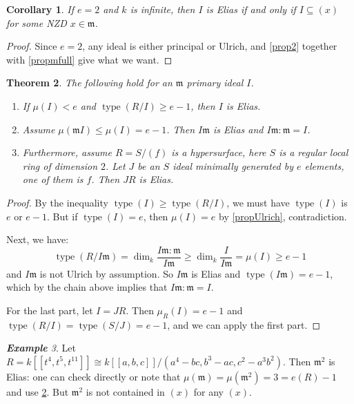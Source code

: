 \documentclass[a4paper,12pt]{amsart}
\newtheorem{thm}{\bf Theorem}[section]
\newtheorem{cor}[thm]{\bf Corollary}
\theoremstyle{definition}
\theoremstyle{remark}
\newtheorem{example}[thm]{\bf Example}
\numberwithin{equation}{section}
\DeclareMathOperator{\type}{{type}}
\DeclareMathOperator{\bm}{{bm}}
\DeclareMathOperator{\burch}{{burch}}
\def\fm{\mathfrak{m}}
\begin{document}






\begin{cor}
If $e=2$ and $k$ is infinite, then $I$ is Elias if and only if $I\subseteq (x)$ for some NZD $x\in \fm$. 
\end{cor}

\begin{proof}
Since $e=2$, any ideal is either principal or Ulrich, and \ref{prop2} together with \ref{propmfull} give what we want. 
\end{proof}


\begin{thm}\label{Elimu} The following hold for an $\fm$ primary ideal $I$.
\begin{enumerate}
\item If $\mu(I)<e$ and $\type(R/I)\geq e-1$, then $I$ is Elias. 
\item Assume $\mu(\fm I)\leq \mu(I)=e-1$. Then $I\fm$ is Elias and $I\fm:\fm=I$. 
\item Furthermore, assume $R=S/(f)$ is a hypersurface, here $S$ is a regular local ring of dimension $2$. Let $J$ be an $S$ ideal minimally generated by $e$ elements, one of them is $f$. Then $JR$ is Elias. 
\end{enumerate}

\end{thm}

\begin{proof}
By the inequality $\type(I)\geq \type(R/I)$, we must have $\type(I)$ is $e$ or $e-1$. But if $\type(I)=e$, then $\mu(I)=e$ by \ref{propUlrich}, contradiction.

Next, we have: $$\type(R/I\fm)=\dim_k \frac{I\fm:\fm}{I\fm}\geq \dim_k \frac{I}{I\fm} = \mu(I)\geq e-1$$ and $I\fm$ is not Ulrich by assumption. So $I\fm$ is Elias and $\type(I\fm)=e-1$, which by the chain above implies that $I\fm:\fm=I$.

For the last  part, let $I=JR$. Then $\mu_R(I)=e-1$  and $\type(R/I)=\type(S/J)=e-1$, and we can apply the first part. 

\end{proof}





\begin{example}\label{exm2}
Let $R=k[[t^4,t^5,t^{11}]]\cong k[[a,b,c]]/(a^4-bc, b^3-ac, c^2-a^3b^2)$. Then $\fm^2$ is Elias: one can check directly or note that $\mu(\fm)=\mu(\fm^2)=3=e(R)-1$ and use \ref{Elimu}. But $\fm^2$ is not contained in $(x)$ for any $(x)$. 
\end{example}
\end{document}
